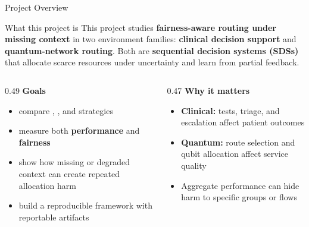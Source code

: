 \begin{frame}
  \titlepage
\end{frame}

\begin{frame}{Project Overview}
\begin{block}{What this project is}
This project studies \textbf{fairness-aware routing under missing context} in two environment families: \textbf{clinical decision support} and \textbf{quantum-network routing}. Both are \textbf{sequential decision systems (SDSs)} that allocate scarce resources under uncertainty and learn from partial feedback.
\end{block}

\begin{columns}[T]
\begin{column}{0.49\textwidth}
\textbf{Goals}
\begin{itemize}
    \item compare \mab, \cmab, and \icmab{} strategies
    \item measure both \textbf{performance} and \textbf{fairness}
    \item show how missing or degraded context can create repeated allocation harm
    \item build a reproducible framework with reportable artifacts
\end{itemize}
\end{column}
\begin{column}{0.47\textwidth}
\textbf{Why it matters}
\begin{itemize}
    \item \textbf{Clinical:} tests, triage, and escalation affect patient outcomes
    \item \textbf{Quantum:} route selection and qubit allocation affect service quality
    \item Aggregate performance can hide harm to specific groups or flows
\end{itemize}
\end{column}
\end{columns}
\end{frame}

